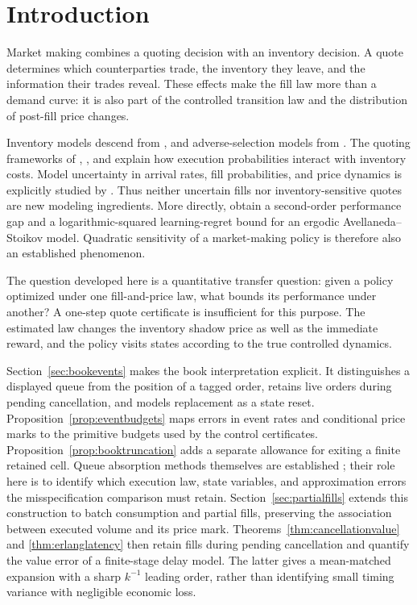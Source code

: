 \documentclass[11pt]{article}
\theoremstyle{plain}
\theoremstyle{definition}
\theoremstyle{remark}
\begin{document}
\section{Introduction}

Market making combines a quoting decision with an inventory decision.
A quote determines which counterparties trade, the inventory they leave,
and the information their trades reveal. These effects make the fill law
more than a demand curve: it is also part of the controlled transition
law and the distribution of post-fill price changes.

Inventory models descend from \citet{HoStoll1981}, and adverse-selection
models from \citet{GlostenMilgrom1985}. The quoting frameworks of
\citet{AvellanedaStoikov2008}, \citet{GueantLehalleFernandezTapia2013},
and \citet{CarteaJaimungalPenalva2015} explain how execution probabilities
interact with inventory costs. Model uncertainty in arrival rates, fill
probabilities, and price dynamics is explicitly studied by
\citet{CarteaDonnellyJaimungal2017}. Thus neither uncertain fills nor
inventory-sensitive quotes are new modeling ingredients.
More directly, \citet{CaoEtAl2026} obtain a second-order performance gap
and a logarithmic-squared learning-regret bound for an ergodic
Avellaneda--Stoikov model. Quadratic sensitivity of a market-making
policy is therefore also an established phenomenon.

The question developed here is a quantitative transfer question:
given a policy optimized under one fill-and-price law, what bounds its
performance under another? A one-step quote certificate is insufficient
for this purpose. The estimated law changes the inventory shadow price
as well as the immediate reward, and the policy visits states according
to the true controlled dynamics.

Section~\ref{sec:bookevents} makes the book interpretation explicit.
It distinguishes a displayed queue from the position of a tagged order,
retains live orders during pending cancellation, and models replacement
as a state reset. Proposition~\ref{prop:eventbudgets} maps errors in
event rates and conditional price marks to the primitive budgets used
by the control certificates. Proposition~\ref{prop:booktruncation}
adds a separate allowance for exiting a finite retained cell. Queue
absorption methods themselves are established
\citep{ContStoikovTalreja2010}; their role here is to identify which
execution law, state variables, and approximation errors the
misspecification comparison must retain.
Section~\ref{sec:partialfills} extends this construction to
batch consumption and partial fills, preserving the association
between executed volume and its price mark.
Theorems~\ref{thm:cancellationvalue} and \ref{thm:erlanglatency}
then retain fills during pending cancellation and quantify the
value error of a finite-stage delay model. The latter gives a
mean-matched expansion with a sharp \(k^{-1}\) leading order,
rather than identifying small timing variance with negligible
economic loss.
\end{document}
